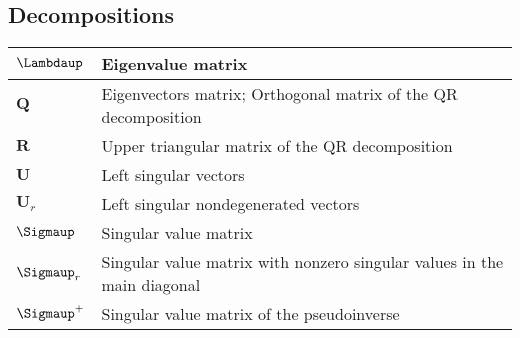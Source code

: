 \subsection{Decompositions}
\begin{xltabular}{\textwidth}{XX}
	\(\boldsymbol{\Lambdaup}\)                                                                  & Eigenvalue matrix \cite{strangIntroductionLinearAlgebra1993}                                                                                                                         \\ \hline
	\(\mathbf{Q}\)                                                                              & Eigenvectors matrix; Orthogonal matrix of the QR decomposition\cite{strangIntroductionLinearAlgebra1993}                                                                             \\ \hline
	\(\mathbf{R}\)                                                                              & Upper triangular matrix of the QR decomposition\cite{strangIntroductionLinearAlgebra1993}                                                                                            \\ \hline
	\(\mathbf{U}\)                                                                              & Left singular vectors\cite{strangIntroductionLinearAlgebra1993}                                                                                                                      \\ \hline
	\(\mathbf{U}_r\)                                                                            & Left singular nondegenerated vectors                                                                                                                                                 \\ \hline
	\(\boldsymbol{\Sigmaup}\)                                                                   & Singular value matrix                                                                                                                                                                \\ \hline
	\(\boldsymbol{\Sigmaup}_r\)                                                                 & Singular value matrix with nonzero singular values in the main diagonal                                                                                                              \\ \hline
	\(\boldsymbol{\Sigmaup}^{+}\)                                                               & Singular value matrix of the pseudoinverse \cite{strangIntroductionLinearAlgebra1993}                                                                                                \\ \hline

\end{xltabular}
